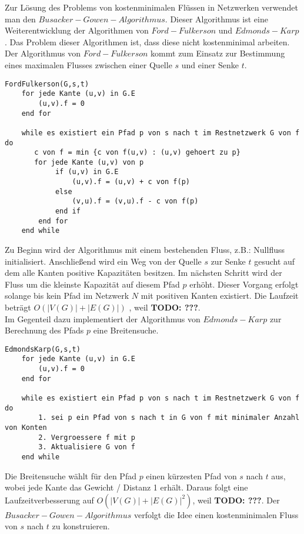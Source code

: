 Zur Lösung des Problems von kostenminimalen Flüssen in Netzwerken verwendet
man den $Busacker-Gowen-Algorithmus$. Dieser Algorithmus ist eine 
Weiterentwicklung der Algorithmen von $Ford-Fulkerson$ und $Edmonds-Karp$. 
Das Problem dieser Algorithmen ist, dass diese nicht kostenminimal arbeiten. 
Der Algorithmus von $Ford-Fulkerson$ kommt zum Einsatz zur Bestimmung eines 
maximalen Flusses zwischen einer Quelle $s$ und einer Senke $t$. 

\begin{lstlisting}
FordFulkerson(G,s,t)
    for jede Kante (u,v) in G.E 
        (u,v).f = 0
    end for
    
    while es existiert ein Pfad p von s nach t im Restnetzwerk G von f do
       c von f = min {c von f(u,v) : (u,v) gehoert zu p}
       for jede Kante (u,v) von p
            if (u,v) in G.E
                (u,v).f = (u,v) + c von f(p)
            else
                (v,u).f = (v,u).f - c von f(p)
            end if
        end for
    end while
\end{lstlisting}

Zu Beginn wird der Algorithmus mit einem bestehenden Fluss, z.B.: Nullfluss 
initialisiert. Anschließend wird ein Weg von der Quelle $s$ zur Senke $t$ 
gesucht auf dem alle Kanten positive Kapazitäten besitzen. Im nächsten 
Schritt wird der Fluss um die kleinste Kapazität auf diesem Pfad $p$
erhöht. Dieser Vorgang erfolgt solange bis kein Pfad im Netzwerk $N$ mit 
positiven Kanten existiert. Die Laufzeit beträgt $O(|V(G)| + |E(G)|)$ ,
weil \textbf{TODO: ???}. \cite{algo, optiv}\\

Im Gegenteil dazu implementiert der Algorithmus von $Edmonds-Karp$ zur 
Berechnung des Pfads $p$ eine Breitensuche. 

\begin{lstlisting}
EdmondsKarp(G,s,t)
    for jede Kante (u,v) in G.E 
        (u,v).f = 0
    end for
    
    while es existiert ein Pfad p von s nach t im Restnetzwerk G von f do
        1. sei p ein Pfad von s nach t in G von f mit minimaler Anzahl von Konten
        2. Vergroessere f mit p
        3. Aktualisiere G von f
    end while
\end{lstlisting}

Die Breitensuche wählt für den 
Pfad $p$ einen kürzesten Pfad von $s$ nach $t$ aus, wobei jede Kante das 
Gewicht / Distanz 1 erhält. Daraus folgt eine Laufzeitverbesserung auf 
$O(|V(G)| + |E(G)|^2)$, weil \textbf{TODO: ???}. \cite{algo, optiv, edmkarp} Der 
$Busacker-Gowen-Algorithmus$ verfolgt die Idee einen kostenminimalen 
Fluss von $s$ nach $t$ zu konstruieren. 

